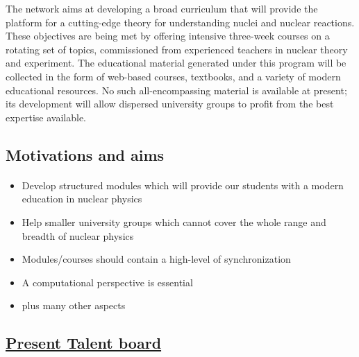 \documentclass[%
oneside,                 %
final,                   %
10pt]{article}
\begin{document}
The network aims at developing a broad curriculum that will provide the platform for a cutting-edge theory for understanding nuclei and nuclear reactions. These objectives are being met by offering intensive three-week courses on a rotating set of topics, commissioned from experienced teachers in nuclear theory and experiment. The educational material generated under this program will be collected in the form of web-based courses, textbooks, and a variety of modern educational resources. No such all-encompassing material is available at present; its development will allow dispersed university groups to profit from the best expertise available.



\subsection*{Motivations and aims}

\paragraph{}
\begin{itemize}
\item Develop structured modules which will provide our students with a modern education in nuclear physics

\item Help smaller university groups which cannot cover the whole range and breadth of nuclear physics

\item Modules/courses should contain a high-level of synchronization

\item A computational perspective is essential

\item plus many other aspects
\end{itemize}

\noindent




\subsection*{\href{{http://fribtheoryalliance.org/TALENT/content/board.php}}{Present Talent board}}

\end{document}
